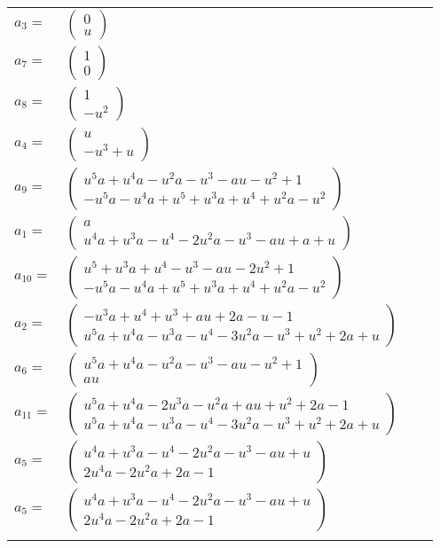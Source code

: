 \documentclass[1p]{elsarticle_modified}
\theoremstyle{definition}
\begin{document}
\begin{tabular}{m{7pt} m{180pt} m{7pt} m{180pt} }
\flushright $a_{3}=$&$\begin{pmatrix}0\\u\end{pmatrix}$ \\
\flushright $a_{7}=$&$\begin{pmatrix}1\\0\end{pmatrix}$ \\
\flushright $a_{8}=$&$\begin{pmatrix}1\\- u^2\end{pmatrix}$ \\
\flushright $a_{4}=$&$\begin{pmatrix}u\\- u^3+u\end{pmatrix}$ \\
\flushright $a_{9}=$&$\begin{pmatrix}u^5 a+u^4 a- u^2 a- u^3- a u- u^2+1\\- u^5 a- u^4 a+u^5+u^3 a+u^4+u^2 a- u^2\end{pmatrix}$ \\
\flushright $a_{1}=$&$\begin{pmatrix}a\\u^4 a+u^3 a- u^4-2 u^2 a- u^3- a u+a+u\end{pmatrix}$ \\
\flushright $a_{10}=$&$\begin{pmatrix}u^5+u^3 a+u^4- u^3- a u-2 u^2+1\\- u^5 a- u^4 a+u^5+u^3 a+u^4+u^2 a- u^2\end{pmatrix}$ \\
\flushright $a_{2}=$&$\begin{pmatrix}- u^3 a+u^4+u^3+a u+2 a- u-1\\u^5 a+u^4 a- u^3 a- u^4-3 u^2 a- u^3+u^2+2 a+u\end{pmatrix}$ \\
\flushright $a_{6}=$&$\begin{pmatrix}u^5 a+u^4 a- u^2 a- u^3- a u- u^2+1\\a u\end{pmatrix}$ \\
\flushright $a_{11}=$&$\begin{pmatrix}u^5 a+u^4 a-2 u^3 a- u^2 a+a u+u^2+2 a-1\\u^5 a+u^4 a- u^3 a- u^4-3 u^2 a- u^3+u^2+2 a+u\end{pmatrix}$ \\
\flushright $a_{5}=$&$\begin{pmatrix}u^4 a+u^3 a- u^4-2 u^2 a- u^3- a u+u\\2 u^4 a-2 u^2 a+2 a-1\end{pmatrix}$\\ \flushright $a_{5}=$&$\begin{pmatrix}u^4 a+u^3 a- u^4-2 u^2 a- u^3- a u+u\\2 u^4 a-2 u^2 a+2 a-1\end{pmatrix}$\\&\end{tabular}
\end{document}
